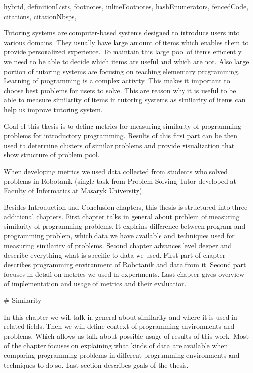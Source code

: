 \documentclass[
  digital, %
  table,   %
  nolof,     %
  nolot,     %
  nocover
]{fithesis3}
\begin{document}
\begin{markdown*}{%
  hybrid,
  definitionLists,
  footnotes,
  inlineFootnotes,
  hashEnumerators,
  fencedCode,
  citations,
  citationNbsps,
}

%
%

Tutoring systems are computer-based systems designed to introduce users into various domains.
They usually have large amount of items which enables them to provide personalized experience. To maintain this large pool of items efficiently we need to be able to decide which items are useful and which are not. Also large portion of tutoring systems are focusing on teaching elementary programming. Learning of programming is a complex activity. This makes it important to choose best problems for users to solve.
This are reason why it is useful to be able to measure similarity of items in tutoring systems as similarity of items can help us improve tutoring system.

Goal of this thesis is to define metrics for measuring similarity of programming problems for introductory programming. Results of this first part can be then used to determine clusters of similar problems and provide visualization that show structure of problem pool.

When developing metrics we used data collected from students who solved problems in Robotanik (single task from Problem Solving Tutor developed at Faculty of Informatics at Masaryk University).

Besides Introduction and Conclusion chapters, this thesis is structured into three additional chapters. First chapter talks in general about problem of measuring similarity of programming problems. It explains difference between program and programming problem, which data we have available and techniques used for measuring similarity of problems. Second chapter advances level deeper and describe everything what is specific to data we used. First part of chapter describes programming environment of Robotanik and data from it. Second part focuses in detail on metrics we used in experiments. Last chapter gives overview of implementation and usage of metrics and their evaluation.


%
%

# Similarity

In this chapter we will talk in general about similarity and where it is used in related fields. Then we will define context of programming environments and problems. Which allows us talk about possible usage of results of this work. Most of the chapter focuses on explaining what kinds of data are available when comparing programming problems in different programming environments and techniques to do so. Last section describes goals of the thesis.


\end{markdown*}
\end{document}
